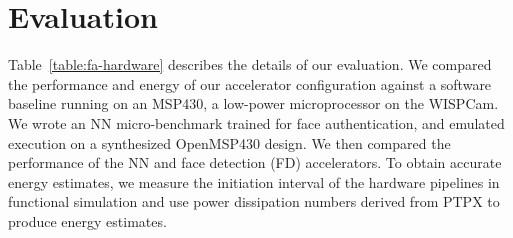 


\section{Evaluation}
Table~\ref{table:fa-hardware} describes the details of our evaluation. We compared the performance and energy of our accelerator configuration against a software baseline running on an MSP430, a low-power microprocessor on the WISPCam. We wrote an NN micro-benchmark trained for face authentication, and emulated execution on a synthesized OpenMSP430 design. We then compared the performance of the NN and face detection (FD) accelerators. To obtain accurate energy estimates, we measure the initiation interval of the hardware pipelines in functional simulation
and use power dissipation numbers derived from PTPX to produce energy estimates.



